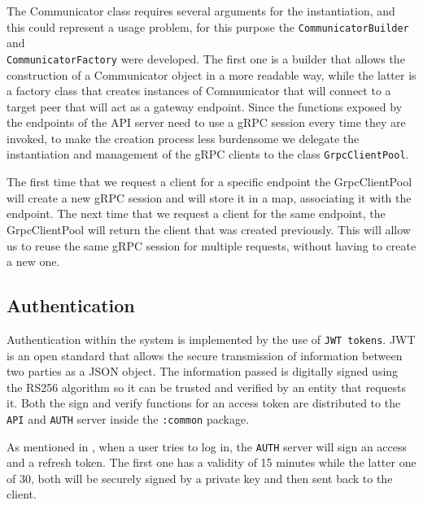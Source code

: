 \documentclass{scrartcl}
\begin{document}
The Communicator class requires several arguments for the instantiation, and this could represent a usage problem, for this purpose the \texttt{CommunicatorBuilder} and \\ \texttt{CommunicatorFactory} were developed. The first one is a builder that allows the construction of a Communicator object in a more readable way, while the latter is a factory class that creates instances of Communicator that will connect to a target peer that will act as a gateway endpoint. Since the functions exposed by the endpoints of the API server need to use a gRPC session every time they are invoked, to make the creation process less burdensome we delegate the instantiation and management of the gRPC clients to the class \texttt{GrpcClientPool}.


The first time that we request a client for a specific endpoint the GrpcClientPool will create a new gRPC session and will store it in a map, associating it with the endpoint. The next time that we request a client for the same endpoint, the GrpcClientPool will return the client that was created previously. This will allow us to reuse the same gRPC session for multiple requests, without having to create a new one.

\subsection{Authentication}
\label{sec:authentication} 
Authentication within the system is implemented by the use of \texttt{JWT tokens}. JWT \cite{jwt} is an open standard that allows the secure transmission of information between two parties as a JSON object. The information passed is digitally signed using the RS256 algorithm so it can be trusted and verified by an entity that requests it. Both the sign and verify functions for an access token are distributed to the \texttt{API} and \texttt{AUTH} server inside the \texttt{:common} package.

As mentioned in , when a user tries to log in, the \texttt{AUTH} server will sign an access and a refresh token. The first one has a validity of 15 minutes while the latter one of 30, both will be securely signed by a private key and then sent back to the client. 

\end{document}
